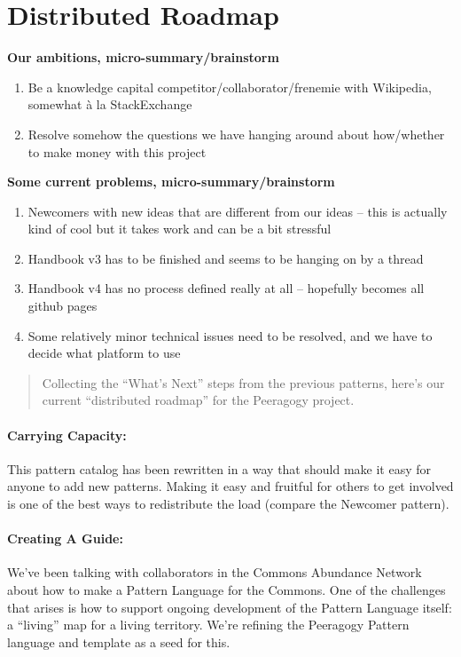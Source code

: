 \section{Distributed Roadmap}

\textbf{Our ambitions, micro-summary/brainstorm}
\begin{enumerate}
\item Be a knowledge capital competitor/collaborator/frenemie with Wikipedia, somewhat \`a la StackExchange
\item Resolve somehow the questions we have hanging around about how/whether to make money with this project 
\end{enumerate}

\textbf{Some current problems, micro-summary/brainstorm}
\begin{enumerate}
\item Newcomers with new ideas that are different from our ideas -- this is actually kind of cool but it takes work and can be a bit stressful
\item Handbook v3 has to be finished and seems to be hanging on by a thread
\item Handbook v4 has no process defined really at all -- hopefully becomes all github pages
\item Some relatively minor technical issues need to be resolved, and we have to decide what platform to use
\end{enumerate}

\begin{quote}
Collecting the ``What's Next'' steps from the previous patterns, here's
our current ``distributed roadmap'' for the Peeragogy project.
\end{quote}

\paragraph{Carrying Capacity:} This pattern catalog has been rewritten in a way that should make it
easy for anyone to add new patterns. Making it easy and fruitful for
others to get involved is one of the best ways to redistribute the load
(compare the Newcomer pattern).

\paragraph{Creating A Guide:} We’ve been talking with collaborators in the Commons Abundance Network
about how to make a Pattern Language for the Commons. One of the
challenges that arises is how to support ongoing development of the
Pattern Language itself: a “living” map for a living territory. We’re
refining the Peeragogy Pattern language and template as a seed for this.

